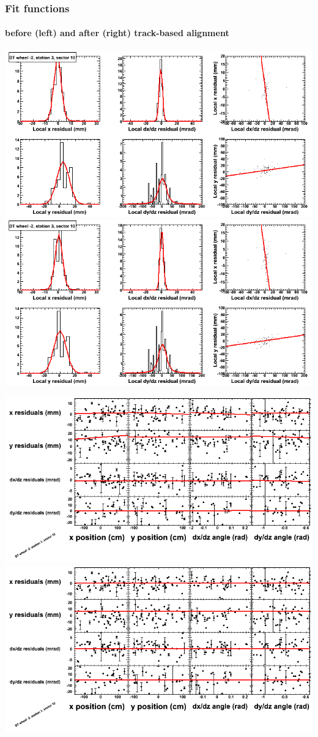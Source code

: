 \documentclass[compress]{beamer}
\begin{document}
\begin{frame}
\frametitle{Fit functions}
\framesubtitle{before (left) and after (right) track-based alignment}
\includegraphics[width=0.5\linewidth]{fitfunctions_re01/MBwhAst3sec10_bellcurves.png} \includegraphics[width=0.5\linewidth]{fitfunctions_re05/MBwhAst3sec10_bellcurves.png}

\includegraphics[width=0.5\linewidth]{fitfunctions_re01/MBwhAst3sec10_polynomials.png} \includegraphics[width=0.5\linewidth]{fitfunctions_re05/MBwhAst3sec10_polynomials.png}
\end{frame}
\end{document}

